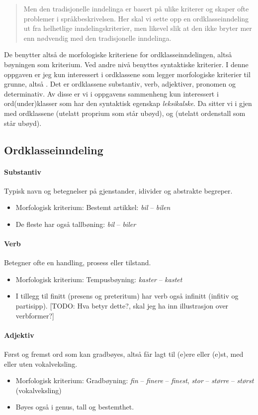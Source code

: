\begin{quote}
Men den tradisjonelle inndelinga er basert på ulike kriterer og skaper ofte problemer i språkbeskrivelsen. Her skal vi sette opp en ordklasseinndeling ut fra helhetlige inndelingskriterier, men likevel slik at den ikke bryter mer enn nødvendig med den tradisjonelle inndelinga.
\end{quote}

De benytter altså de morfologiske kriteriene for ordklasseinndelingen, altså bøyningen som kriterium. Ved andre nivå benyttes syntaktiske kriterier. I denne oppgaven er jeg kun interessert i ordklassene som legger morfologiske kriterier til grunne, altså . Det er ordklassene substantiv, verb, adjektiver, pronomen og determinativ.  Av disse er vi i oppgavens sammenheng kun interessert i ord(under)klasser som har den syntaktisk egenskap \textit{leksikalske}. Da sitter vi i gjen med ordklassene  (utelatt proprium som står ubøyd),  og  (utelatt ordenstall som står ubøyd).

\subsection{Ordklasseinndeling}

\paragraph{Substantiv} Typisk navn og betegnelser på gjenstander, idivider og abstrakte begreper.
	\begin{itemize}
		\item Morfologisk kriterium: Bestemt artikkel: \textit{bil} -- \textit{bilen}
		\item De fleste har også tallbøning: \textit{bil} -- \textit{biler}
	\end{itemize}
\paragraph{Verb} Betegner ofte en handling, prosess eller tilstand.
	\begin{itemize}
		\item Morfologisk kriterium: Tempusbøyning: \textit{kaster} -- \textit{kastet}
		\item I tillegg til finitt (presens og preteritum) har verb også infinitt (infitiv og partisipp). [TODO: Hva betyr dette?, skal jeg ha inn illustrasjon over verbformer?]
	\end{itemize}
	
\paragraph{Adjektiv} Først og fremst ord som kan gradbøyes, altså får lagt til (e)ere eller (e)st, med eller uten vokalveksling.
	\begin{itemize}
		\item Morfologisk kriterium: Gradbøyning: \textit{fin} -- \textit{finere} -- \textit{finest}, \textit{stor} -- \textit{større} -- \textit{størst} (vokalveksling)
		\item Bøyes også i genus, tall og bestemthet.
	\end{itemize}
